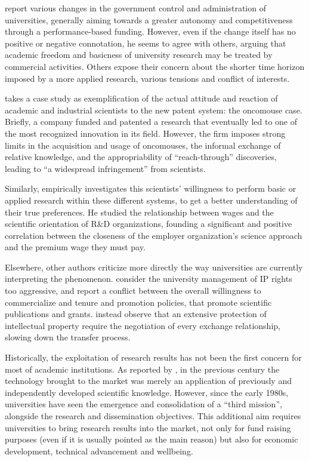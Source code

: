 \citet{Rasmussen2006} report various changes in the government control and administration of universities, generally aiming towards a greater autonomy and competitiveness through a performance-based funding. However, even if the change itself has no positive or negative connotation, he seems to agree with others, arguing that academic freedom and basicness of university research may be treated by commercial activities. Others expose their concern about the shorter time horizon imposed by a more applied research, various tensions and conflict of interests. 

\citet{Murray2005} takes a case study as exemplification of the actual attitude and reaction of academic and industrial scientists to the new patent system: the oncomouse case. Briefly, a company funded and patented a research that eventually led to one of the most recognized innovation in its field. However, the firm imposes strong limits in the acquisition and usage of oncomouses, the informal exchange of relative knowledge, and the appropriability of \enquote{reach-through} discoveries, leading to \enquote{a widespread infringement} from scientists. 

Similarly, \citet{Stern2004} empirically investigates this scientists' willingness to perform basic or applied research within these different systems, to get a better understanding of their true preferences. He studied the relationship between wages and the scientific orientation of R\&D organizations, founding a significant and positive correlation between the closeness of the employer organization's science approach and the premium wage they must pay.

Elsewhere, other authors criticize more directly the way universities are currently interpreting the phenomenon. \citet{Siegel2003a} consider the university management of IP rights too aggressive, and report a conflict between the overall willingness to commercialize and tenure and promotion policies, that promote scientific publications and grants. \citet{Murray2005} instead observe that an extensive protection of intellectual property require the negotiation of every exchange relationship, slowing down the transfer process.

Historically, the exploitation of research results has not been the first concern for most of academic institutions. As reported by \citet{Balconi2006}, in the previous century the technology brought to the market was merely an application of previously and independently developed scientific knowledge. However, since the early 1980s, universities have seen the emergence and consolidation of a \enquote{third mission}, alongside the research and dissemination objectives. This additional aim requires universities to bring research results into the market, not only for fund raising purposes (even if it is usually pointed as the main reason) but also for economic development, technical advancement and wellbeing. 


